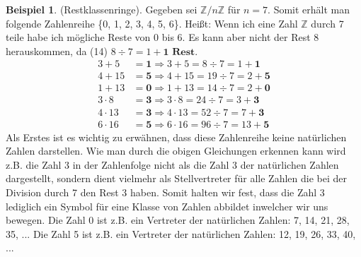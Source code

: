 \documentclass[12pt,a4paper]{article}
\theoremstyle{definition}
\newtheorem{bsp}{Beispiel}[subsection]
\begin{document}
\begin{bsp}(Restklassenringe).\newline
Gegeben sei $\mathbb{Z}/n \mathbb{Z}$ für $n = 7$.\newline
Somit erhält man folgende Zahlenreihe \{0, 1, 2, 3, 4, 5, 6\}.\newline
Heißt: Wenn ich eine Zahl $\mathbb{Z}$ durch 7 teile habe ich mögliche Reste von 0 bis 6.
Es kann aber nicht der Rest 8 herauskommen, da (14) $8 \div 7 = 1 + \textbf{1 Rest}$.
\begin{align}
3 + 5      &= \textbf{1} \Rightarrow 3 + 5 = 8  \div 7 = 1 + \textbf{1} \\
4 + 15     &= \textbf{5} \Rightarrow 4 + 15 = 19  \div 7 = 2 + \textbf{5} \\
1 + 13     &= \textbf{0} \Rightarrow 1 + 13 = 14  \div 7 = 2 + \textbf{0} \\
3 \cdot 8  &= \textbf{3} \Rightarrow 3 \cdot 8 = 24 \div 7 = 3 + \textbf{3}\\
4 \cdot 13 &= \textbf{3} \Rightarrow 4 \cdot 13 = 52 \div 7 = 7 + \textbf{3}\\
6 \cdot 16 &= \textbf{5} \Rightarrow 6 \cdot 16 = 96 \div 7 = 13 + \textbf{5}
\end{align}
Als Erstes ist es wichtig zu erwähnen, dass diese Zahlenreihe keine natürlichen Zahlen darstellen.
Wie man durch die obigen Gleichungen erkennen kann wird z.B. die Zahl 3 in der Zahlenfolge nicht als die Zahl 3 der natürlichen Zahlen dargestellt, sondern dient vielmehr als Stellvertreter für alle Zahlen die bei der Division durch 7 den Rest 3 haben.
Somit halten wir fest, dass die Zahl 3 lediglich ein Symbol für eine Klasse von Zahlen abbildet inwelcher wir uns bewegen.\newline
Die Zahl 0 ist z.B. ein Vertreter der natürlichen Zahlen: 7, 14, 21, 28, 35, ...\newline
Die Zahl 5 ist z.B. ein Vertreter der natürlichen Zahlen: 12, 19, 26, 33, 40, ...
\end{bsp}
\end{document}

